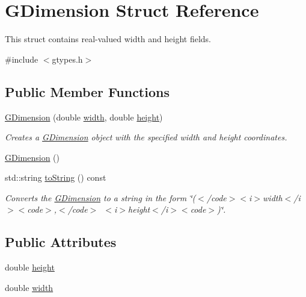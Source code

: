 \hypertarget{structsgl_1_1GDimension}{}\section{G\+Dimension Struct Reference}
\label{structsgl_1_1GDimension}


This struct contains real-\/valued width and height fields.  




{\ttfamily \#include $<$gtypes.\+h$>$}

\subsection*{Public Member Functions}
\begin{DoxyCompactItemize}
\item 
\mbox{\hyperlink{structsgl_1_1GDimension_a0b3f30cd49c082f8e0245af828bd9000}{G\+Dimension}} (double \mbox{\hyperlink{structsgl_1_1GDimension_a9df23e056f5d1a0388cd8190431c0e03}{width}}, double \mbox{\hyperlink{structsgl_1_1GDimension_a89f6abd564014faeff7cd20c340a9c7d}{height}})
\begin{DoxyCompactList}\small\item\em Creates a {\ttfamily \mbox{\hyperlink{structsgl_1_1GDimension}{G\+Dimension}}} object with the specified {\ttfamily width} and {\ttfamily height} coordinates. \end{DoxyCompactList}\item 
\mbox{\hyperlink{structsgl_1_1GDimension_aedebfb3f99b96fb04c9f16926d11fcc5}{G\+Dimension}} ()
\item 
std\+::string \mbox{\hyperlink{structsgl_1_1GDimension_a1fe5121d6528fdea3f243321b3fa3a49}{to\+String}} () const
\begin{DoxyCompactList}\small\item\em Converts the {\ttfamily \mbox{\hyperlink{structsgl_1_1GDimension}{G\+Dimension}}} to a string in the form {\ttfamily \char`\"{}($<$/code$>$$<$i$>$width$<$/i$>$$<$code$>$,$<$/code$>$~$<$i$>$height$<$/i$>$$<$code$>$)\char`\"{}}. \end{DoxyCompactList}\end{DoxyCompactItemize}
\subsection*{Public Attributes}
\begin{DoxyCompactItemize}
\item 
double \mbox{\hyperlink{structsgl_1_1GDimension_a89f6abd564014faeff7cd20c340a9c7d}{height}}
\item 
double \mbox{\hyperlink{structsgl_1_1GDimension_a9df23e056f5d1a0388cd8190431c0e03}{width}}
\end{DoxyCompactItemize}


